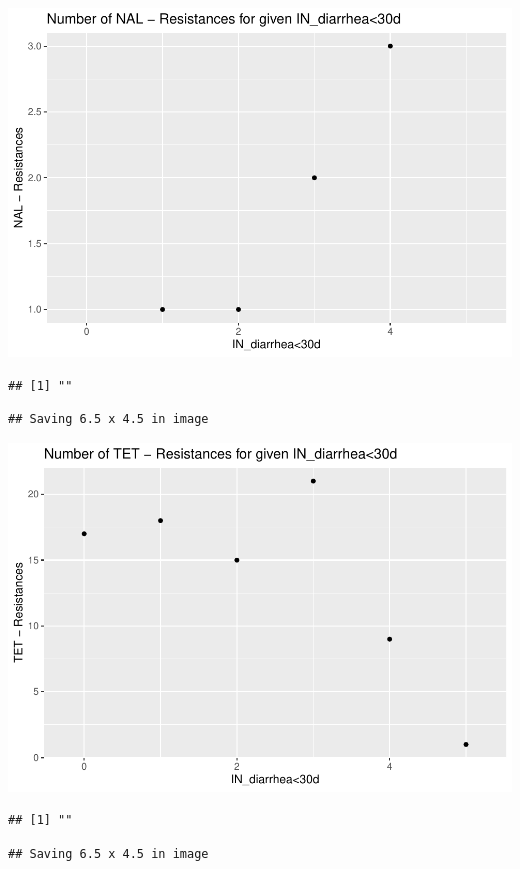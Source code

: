 \documentclass[
]{article}
\begin{document}
\includegraphics{NResistenzen_files/figure-latex/numerical_variables-37.pdf}

\begin{verbatim}
## [1] ""
\end{verbatim}

\begin{verbatim}
## Saving 6.5 x 4.5 in image
\end{verbatim}

\includegraphics{NResistenzen_files/figure-latex/numerical_variables-38.pdf}

\begin{verbatim}
## [1] ""
\end{verbatim}

\begin{verbatim}
## Saving 6.5 x 4.5 in image
\end{verbatim}
\end{document}
